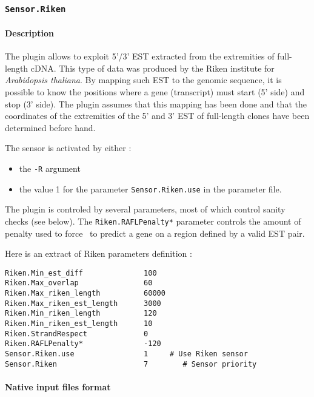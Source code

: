 
\subsubsection{\texttt{Sensor.Riken}}

\paragraph{Description}

The plugin allows to exploit 5'/3' EST extracted from the extremities
of full-length cDNA. This type of data was produced by the Riken
institute for \emph{Arabidopsis thaliana}. By mapping such EST to the genomic
sequence, it is possible to know the positions where a gene
(transcript) must start (5' side) and stop (3' side). The plugin
assumes that this mapping has been done and that the coordinates of
the extremities of the 5' and 3' EST of full-length clones have been
determined before hand.

The sensor is activated by either :
\begin{itemize}
\item the \texttt{-R} argument 
\item the value 1 for the parameter \texttt{Sensor.Riken.use} in the
  parameter file.
\end{itemize}

The plugin is controled by several parameters, most of which control
sanity checks (see below). The \texttt{Riken.RAFLPenalty*} parameter
controls the amount of penalty used to force \EuGene\ to predict a
gene on a region defined by a valid EST pair.

Here is an extract of Riken parameters definition :
\begin{Verbatim}[fontsize=\small]
Riken.Min_est_diff              100
Riken.Max_overlap               60
Riken.Max_riken_length          60000
Riken.Max_riken_est_length      3000
Riken.Min_riken_length          120 
Riken.Min_riken_est_length      10
Riken.StrandRespect             0
Riken.RAFLPenalty*              -120
Sensor.Riken.use                1     # Use Riken sensor
Sensor.Riken                    7        # Sensor priority
\end{Verbatim}

\paragraph{Native input files format}

